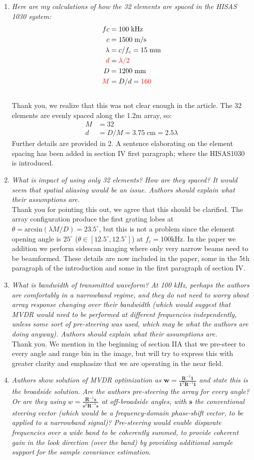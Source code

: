 \documentclass[11pt]{article} %
\newcommand\T{^{\scriptscriptstyle T}}
\renewcommand\vec[1]{\boldsymbol{#1}}
\newcommand\mat[1]{\boldsymbol{#1}}
\newcommand\1{\vec 1}
\newcommand*\s{\vec s}
\newcommand*\w{\vec w}
\newcommand*\R{\mat R}
\newcommand*\Ri{\R^{-1}}
\renewcommand*\t{^T}
\newcommand\q[1]{\textit{#1}}
\newcommand\qi[1]{\item\q{#1}}
\newcommand\ans[1]{#1}
\newcommand\ai[1]{\\[.5\baselineskip]\ans{#1}}
\begin{document}
\begin{enumerate}
\qi{Here are my calculations of how the 32 elements are spaced in the HISAS 1030 system:}
\begin{align}
fc &= 100\;\text{kHz} \\
c  &= 1500\;\text{m/s} \\
\lambda &= c/f_c = 15\;\text{mm} \\
\textcolor{red}{ d } &= \textcolor{red}{\lambda/2 } \\
D &= 1200\;\text{mm} \\
\textcolor{red}{M} &= D/d = \textcolor{red}{160}
\end{align}
\ai{Thank you, we realize that this was not clear enough in the article. The 32 elements are evenly spaced along the 1.2m array, so:
\begin{align}
M &= 32 \\
d &= D / M = 3.75\;\text{cm} = 2.5\lambda
\end{align}
Further details are provided in 2. A sentence elaborating on the element spacing has been added in section IV first paragraph; where the HISAS1030 is introduced.}
%
\qi{What is impact of using only 32 elements? How are they spaced? It would seem that spatial aliasing would be an issue. Authors should explain what their assumptions are.}
\ai{Thank you for pointing this out, we agree that this should be clarified. The array configuration produce the first grating lobes at $\theta = \text{arcsin}(\lambda M/D) = 23.5^\circ$, but this is not a problem since the element opening angle is $25^\circ$ ($\theta\in[12.5^\circ,12.5^\circ]$) at $f_c=100$\;kHz. In the paper we addition we perform sidescan imaging where only very narrow beams need to be beamformed. These details are now included in the paper, some in the 5th paragraph of the introduction and some in the first paragraph of section IV.}
%
\qi{What is bandwidth of transmitted waveform? At 100 kHz, perhaps the authors are comfortably in a narrowband regime, and they do not need to worry about array response changing over their bandwidth (which would suggest that MVDR would need to be performed at different frequencies independently, unless some sort of pre-steering was used, which may be what the authors are doing anyway). Authors should explain what their assumptions are.}
\ai{Thank you. We mention in the beginning of section IIA that we pre-steer to every angle and range bin in the image, but will try to express this with greater clarity and emphasize that we are operating in the near field.}
%
\qi{Authors show solution of MVDR optimization as $\w = \frac{\Ri\1}{\1\T\Ri\1}$ and state this is the broadside solution. Are the authors pre-steering the array for every angle? Or are they using $w = \frac{\Ri\s}{\s\t\Ri\s}$ at off-broadside angles, with $\s$ the conventional steering vector (which would be a frequency-domain phase-shift vector, to be applied to a narrowband signal)? Pre-steering would enable disparate frequencies over a wide band to be coherently summed, to provide coherent gain in the look direction (over the band) by providing additional sample support for the sample covariance estimation.}

\end{enumerate}
\end{document}
